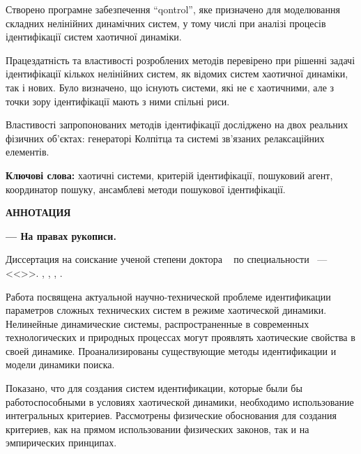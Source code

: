 \documentclass[a4paper,13pt]{atuaref}
\newcommand{\xsect}[1]{\vspace{0.15ex}\begin{center}\textbf{#1}\end{center}\vspace{4pt}\penalty10000}
\begin{document}
Створено програмне забезпечення ``qontrol'',
яке призначено для моделювання складних нелінійних динамічних
систем, у тому числі при аналізі процесів ідентифікації систем хаотичної динаміки.

Працездатність та властивості розроблених методів перевірено при
рішенні задачі ідентифікації кількох нелінійних систем,
як відомих систем хаотичної динаміки, так і нових.
Було визначено, що існують системи, які не є хаотичними, але
з точки зору ідентифікації мають з ними спільні риси.

Властивості запропонованих методів ідентифікації досліджено
на двох реальних фізичних об'єктах:
генераторі Колпітца та системі зв'язаних релаксаційних елементів.

\textbf{Ключові слова:}
хаотичні системи,
критерій ідентифікації,
пошуковий агент,
координатор пошуку,
ансамблеві методи пошукової ідентифікації.


\xsect{АННОТАЦИЯ}

\textbf{\dissauthorRu}
\textbf{\booknameRu}
\textbf{--- На правах рукописи.}

Диссертация на соискание ученой степени
доктора
\dissScopeRu\ {}
по специальности
\dissSpecId\ --- <<\dissSpecRu>>.
\institutionRu, \belongRu, \cityRu, \bookyear.

Работа посвящена актуальной научно-технической проблеме идентификации
параметров сложных технических систем в режиме хаотической динамики. Нелинейные
динамические системы, распространенные в современных технологических и
природных процессах могут проявлять хаотические свойства в своей динамике.
%
Проанализированы существующие методы идентификации и модели динамики поиска.

Показано, что для создания систем идентификации, которые были бы работоспособными
в условиях хаотической динамики, необходимо использование интегральных критериев.
Рассмотрены физические обоснования для создания критериев,
как на прямом использовании физических законов, так и на
эмпирических принципах.
\end{document}

